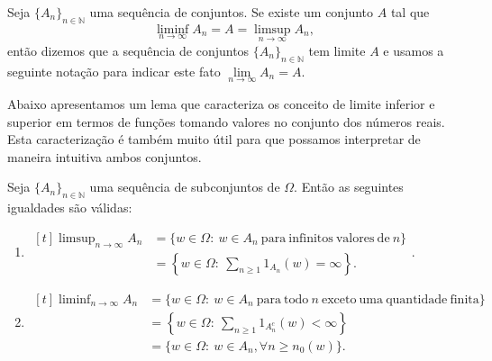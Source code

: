 \begin{definicao}
	Seja $\{A_n\}_{n\in\mathbb{N} }$  uma sequência de conjuntos.
	Se existe um conjunto $A$ tal que 
	\[
		\liminf \limits_{n \to \infty} A_n 
		= 
		A
		=
		\limsup \limits_{n \to \infty} A_n, 
	\]	
	então dizemos que a sequência de conjuntos 
	$\{A_n\}_{n\in\mathbb{N}}$ tem limite $A$  
	e usamos a seguinte notação para indicar este fato 
	$\lim \limits_{n \to \infty} A_n = A$.
\end{definicao}



Abaixo apresentamos um lema que caracteriza os 
conceito de limite inferior e superior em 
termos de funções tomando valores no 
conjunto dos números reais. Esta caracterização 
é também muito útil para que possamos interpretar
de maneira intuitiva ambos conjuntos.  


\begin{lema}\label{lema-caracterizacao-limsup-liminf}
Seja $\{A_n\}_{n\in\mathbb{N}}$ uma sequência de subconjuntos de $\Omega$.
Então as seguintes igualdades são válidas:
\begin{enumerate}
\item 
$
\begin{aligned}[t]
\displaystyle
\limsup_{n\to\infty} A_n 
&=
	\{ w \in \Omega:
		\ w \in A_n\ \mathrm{para\ infinitos\ valores\ de}\ n
	\} 
\\
&= 
\left\{ 
w \in \Omega: \ \sum_{n \geqslant 1} 1_{A_n}(w)= \infty 
\right\}.
\end{aligned}
$.

\vspace*{0.3cm}


\item  
$
\begin{aligned}[t]
\liminf_{n\to\infty} A_n 
&=
	\{ w \in \Omega:
		\ w \in A_n\ \mathrm{para\ todo}\ n\ \mathrm{exceto\ uma\ quantidade\ finita} 
	\} 
\\
&= 
	\left\{w \in \Omega:
		\ \sum_{n\geqslant 1} 1_{A_n^c}(w) < \infty 
	\right\} 
\\[0.2cm]
&= 
	\{w \in \Omega:
		\ w \in A_n, \forall n \geqslant n_0(w) 
	\}. 
\end{aligned} 
$
\end{enumerate}
\end{lema}

